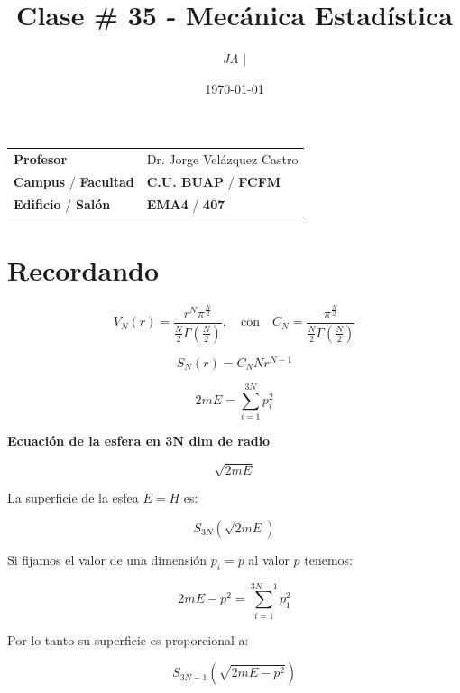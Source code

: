 \documentclass{article}
\title{Clase \# 35 - Mecánica Estadística}
\author{\emph{JA} $\boldsymbol{\mid}$}
\date{\today}
\begin{document}
\maketitle



\begin{mybox}
\noindent\begin{tabular}{@{}ll}
	{\bfseries{Profesor}} & Dr. Jorge Velázquez Castro\\
	\textcolor{prussianblue}{\bfseries{Campus}} / \textcolor{trueblue}{\bfseries{Facultad}}  & \textcolor{prussianblue}{\bfseries{C.U. BUAP}} /  \textcolor{trueblue}{\bfseries{FCFM}} \\
	\textcolor{prussianblue}{\bfseries{Edificio}} /  \textcolor{trueblue}{\bfseries{Salón}}    & 	\textcolor{prussianblue}{\bfseries{EMA4}} /  \textcolor{trueblue}{\bfseries{407}}   
\end{tabular} 
\end{mybox} \vspace{1cm}

\tableofcontents

\vspace{2cm}


\section{Recordando}

\[V_{N}(r) = \frac{r^{N}\pi^{\frac{N}{2}}}{\frac{N}{2}\Gamma \left(\frac{N}{2}\right)}, \quad \text{con} \quad C_{N}= \frac{\pi^{\frac{N}{2}}}{\frac{N}{2}\Gamma \left( \frac{N}{2} \right)}  \]


\[ S_{N}(r) = C_{N}Nr^{N-1}  \]

\[ 2mE=\sum\limits_{i=1}^{3N} p_{i}^{2}  \]

\textbf{Ecuación de la esfera en 3N dim de radio}

\[ \sqrt{2mE} \]


La superficie de la esfea $E=H$ es:


\[ S_{3N}\left( \sqrt{2mE} \right)   \]



Si fijamos el valor de una dimensión $p_{i}=p$ al valor $p$ tenemos:


\[ 2mE-p^{2} = \sum\limits_{i=1}^{3N-1}p_{1}^{2}   \]

Por lo tanto su superficie es proporcional a:


\[ S_{3N-1} \left(  \sqrt{ 2mE-p^{2}  }   \right)   \]
\end{document}
